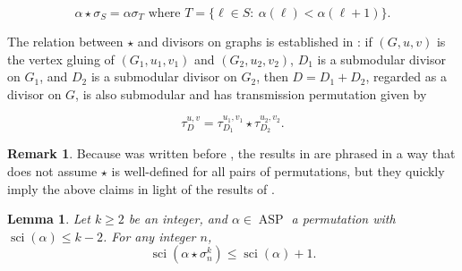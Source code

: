 \documentclass[11pt]{article}
\newtheorem{lemma}[theo]{Lemma}
\theoremstyle{definition}
\newtheorem{rema}[theo]{Remark}
\numberwithin{equation}{section}
\newcommand{\tauD}{\tau^{u,v}_D}
\newcommand{\tauDi}[1]{\tau^{u_{#1},v_{#1}}_{D_{#1}}}
\newcommand{\asp}{\operatorname{ASP}}
\newcommand{\sci}{\operatorname{sci}}
\begin{document}
\begin{equation}\label{eq:starSigma}
\alpha \star \sigma_S =  \alpha \sigma_T
\mbox{ where }
T = \{ \ell \in S:\ \alpha(\ell) < \alpha(\ell+1)\}.
\end{equation}


The relation between $\star$ and divisors on graphs is established in \cite[Theorem 3.11]{Pfl17}: if $(G,u,v)$ is the vertex gluing of $(G_1,u_1, v_1)$ and $(G_2, u_2, v_2)$, $D_1$ is a submodular divisor on $G_1$, and $D_2$ is a submodular divisor on $G_2$, then $D = D_1 + D_2$, regarded as a divisor on $G$, is also submodular and has transmission permutation given by

\begin{equation}\label{eq:tauGlued}
\tauD = \tauDi{1} \star \tauDi{2}.
\end{equation}

\begin{rema}
Because \cite{Pfl17} was written before \cite{PflDemProd}, the results in \cite{Pfl17} are phrased in a way that does not assume $\star$ is well-defined for all pairs of permutations, but they quickly imply the above claims in light of the results of \cite{PflDemProd}.
\end{rema}

\begin{lemma}\label{lem-SciSimpleRefl}
Let $k \geq 2$ be an integer, and $\alpha \in \asp$ a permutation with $\sci(\alpha) \leq k-2$. For any integer $n$,
$$\sci(\alpha \star \sigma^k_n) \leq \sci(\alpha)+1.$$
\end{lemma}
\end{document}

